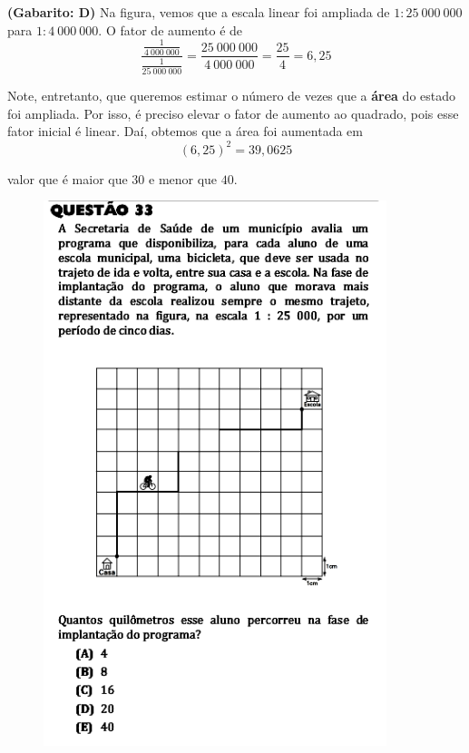 \documentclass[a4paper]{article}
\begin{document}
\par\textbf{(Gabarito: D)} Na figura, vemos que a escala linear foi ampliada de $1:25\ 000\ 000$ para $1: 4\ 000\ 000$. O fator de aumento é de
\begin{equation*}
\frac{\frac{1}{4\ 000\ 000}}{ \frac{1}{25\ 000\ 000} } = \frac{25\ 000\ 000}{4\ 000\ 000} = \frac{25}{4} = 6,25
\end{equation*}
\par\vspace{0.3cm} Note, entretanto, que queremos estimar o número de vezes que a \textbf{área} do estado foi ampliada. Por isso, é preciso elevar o fator de aumento ao quadrado, pois esse fator inicial é linear. Daí, obtemos que a área foi aumentada em
\begin{equation*}
(6,25)^2 = 39,0625
\end{equation*}
\par\vspace{0.3cm} valor que é maior que $30$ e menor que $40$.
\begin{figure}[H]
	\begin{center}
		\includegraphics[width=10cm]{L2Q33.png}
	\end{center}
\end{figure}
\end{document}
